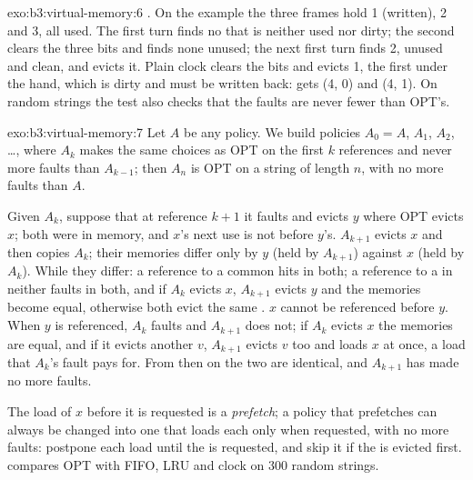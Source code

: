 \begin{solution}{exo:b3:virtual-memory:6}
. On the example the three frames hold 1 (written), 2 and 3, all used. The first turn finds no  that is neither used nor dirty; the second clears the three bits and finds none unused; the next first turn finds  2, unused and clean, and evicts it. Plain clock clears the bits and evicts  1, the first under the hand, which is dirty and must be written back:  gets (4, 0) and (4, 1). On random strings the test also checks that the faults are never fewer than OPT's.
\end{solution}

\begin{solution}{exo:b3:virtual-memory:7}
Let $A$ be any policy. We build policies $A_0 = A$, $A_1$, $A_2$, \dots, where $A_k$ makes the same choices as OPT on the first $k$ references and never more faults than $A_{k-1}$; then $A_n$ is OPT on a string of length $n$, with no more faults than $A$.

Given $A_k$, suppose that at reference $k + 1$ it faults and evicts $y$ where OPT evicts $x$; both were in memory, and $x$'s next use is not before $y$'s. $A_{k+1}$ evicts $x$ and then copies $A_k$; their memories differ only by $y$ (held by $A_{k+1}$) against $x$ (held by $A_k$). While they differ: a reference to a common  hits in both; a reference to a  in neither faults in both, and if $A_k$ evicts $x$, $A_{k+1}$ evicts $y$ and the memories become equal, otherwise both evict the same . $x$ cannot be referenced before $y$. When $y$ is referenced, $A_k$ faults and $A_{k+1}$ does not; if $A_k$ evicts $x$ the memories are equal, and if it evicts another  $v$, $A_{k+1}$ evicts $v$ too and loads $x$ at once, a load that $A_k$'s fault pays for. From then on the two are identical, and $A_{k+1}$ has made no more faults.

The load of $x$ before it is requested is a \emph{prefetch}; a policy that prefetches can always be changed into one that loads each  only when requested, with no more faults: postpone each load until the  is requested, and skip it if the  is evicted first.  compares OPT with FIFO, LRU and clock on 300 random strings.
\end{solution}

